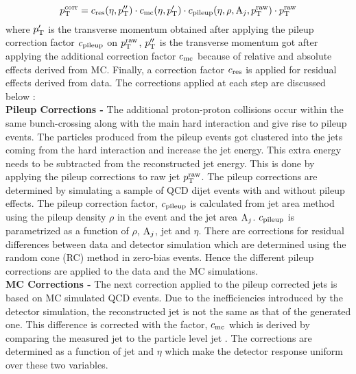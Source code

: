 \begin{equation}
p^{\rm corr}_{\rm T} = c_{\rm res}(\eta,p''_{\rm T})\cdot c_{\rm mc}(\eta,p'_{\rm T})\cdot c_{\rm pileup}(\eta,\rho,{\rm A}_{j},p^{\rm raw}_{\rm T})\cdot p^{\rm raw}_{\rm T}
\end{equation}
where $p'_{\rm T}$ is the transverse momentum obtained after applying the pileup correction factor $c_{\rm pileup}$ on $p^{\rm raw}_{\rm T}$, $p''_{\rm T}$ is the transverse momentum got after applying the additional correction factor $c_{\rm mc}$ because of relative and absolute effects derived from MC. Finally, a correction factor $c_{\rm res}$ is applied for residual effects derived from data. The corrections applied at each step are discussed below : \\\newline
{\bf Pileup Corrections -} The additional proton-proton collisions occur within the same bunch-crossing along with the main hard interaction and give rise to pileup events. The particles produced from the pileup events got clustered into the jets coming from the hard interaction and increase the jet energy. This extra energy needs to be subtracted from the reconstructed jet energy. This is done by applying the pileup corrections to raw jet $p^{\rm raw}_{\rm T}$. The pileup corrections are determined by simulating a sample of QCD dijet events with and without pileup effects. The pileup correction factor, $c_{\rm pileup}$ is calculated from jet area method using the pileup density $\rho$ in the event and the jet area ${\rm A}_{j}$. $c_{\rm pileup}$ is parametrized as a function of $\rho$, ${\rm A}_{j}$, jet \pt and $\eta$. There are corrections for residual differences between data and detector simulation which are determined using the random cone (RC) method in zero-bias events. Hence the different pileup corrections are applied to the data and the MC simulations. \\ \newline
{\bf MC Corrections -} The next correction applied to the pileup corrected jets is based on MC simulated QCD events. Due to the inefficiencies introduced by the detector simulation, the reconstructed jet \pt is not the same as that of the generated one. This difference is corrected with the factor, $c_{\rm mc}$ which is derived by comparing the measured jet \pt to the particle level jet \pt. The corrections are determined as a function of jet \pt and $\eta$ which make the detector response uniform over these two variables. \\ \newline
